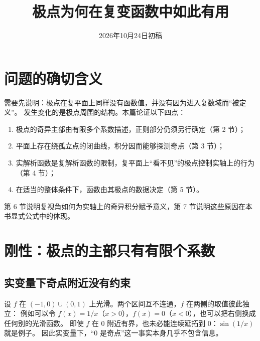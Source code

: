 \documentclass[11pt]{article}
\date{2026年10月24日初稿}
\title{极点为何在复变函数中如此有用}
\begin{document}
\maketitle

\par\medskip

\section{问题的确切含义}
需要先说明：极点在复平面上同样没有函数值，并没有因为进入复数域而“被定义”。
发生变化的是极点周围的结构。本篇论证以下四点：
\begin{enumerate}
 \item 极点的奇异主部由有限多个系数描述，正则部分仍须另行确定（第 2 节）；
 \item 平面上存在绕孤立点的闭曲线，积分因而能够探测奇点（第 3 节）；
 \item 实解析函数是复解析函数的限制，复平面上“看不见”的极点控制实轴上的行为（第 4 节）；
 \item 在适当的整体条件下，函数由其极点的数据决定（第 5 节）。
\end{enumerate}
第 6 节说明复视角如何为实轴上的奇异积分赋予意义，第 7 节说明这些原因在本书显式公式中的体现。

\section{刚性：极点的主部只有有限个系数}
\subsection{实变量下奇点附近没有约束}
设 $f$ 在 $(-1,0)\cup(0,1)$ 上光滑。两个区间互不连通，$f$ 在两侧的取值彼此独立：
例如可以令 $f(x)=1/x$（$x>0$），$f(x)=0$（$x<0$），也可以把右侧换成任何别的光滑函数。
即使 $f$ 在 $0$ 附近有界，也未必能连续延拓到 $0$：$\sin(1/x)$ 就是例子。
因此实变量下，“$0$ 是奇点”这一事实本身几乎不包含信息。
\end{document}

